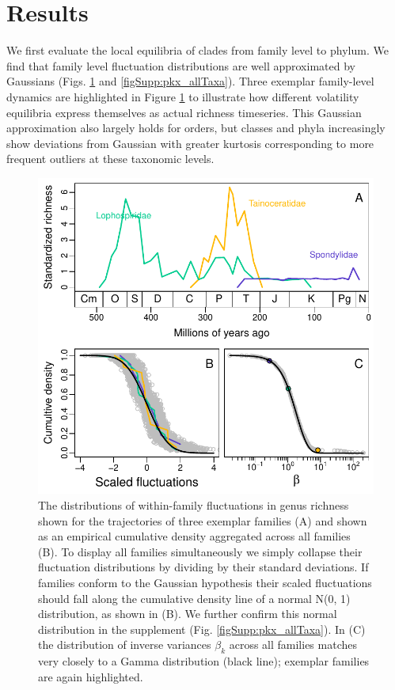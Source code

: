\documentclass[12pt]{article}
\begin{document}
\section{Results}

We first evaluate the local equilibria of clades from family level to
phylum. We find that family level fluctuation distributions are well
approximated by Gaussians (Figs. \ref{fig:pk_f} and
\ref{figSupp:pkx_allTaxa}).  Three exemplar family-level dynamics are
highlighted in Figure \ref{fig:pk_f} to illustrate how different
volatility equilibria express themselves as actual richness timeseries.
This Gaussian approximation also largely holds for orders, but classes
and phyla increasingly show deviations from Gaussian with greater
kurtosis corresponding to more frequent outliers at these taxonomic
levels.


\begin{figure}[!h]
  \centering
  \includegraphics[scale=0.8]{../../fig_pkx-fbeta.pdf}
  \caption[Variability in trajectories of within-family fluctuations in
  genus richness]{The distributions of within-family fluctuations in
    genus richness shown for the trajectories of three exemplar
    families (A) and shown as an empirical cumulative density
    aggregated across all families (B). To display all families
    simultaneously we simply collapse their fluctuation distributions
    by dividing by their standard deviations. If families conform to
    the Gaussian hypothesis their scaled fluctuations should fall
    along the cumulative density line of a normal N(0, 1)
    distribution, as shown in (B). We further confirm this normal
    distribution in the supplement
    (Fig. \ref{figSupp:pkx_allTaxa}). In (C) the distribution of
    inverse variances $\beta_k$ across all families matches very
    closely to a Gamma distribution (black line); exemplar families
    are again highlighted.}
  \label{fig:pk_f}
\end{figure}
\end{document}

